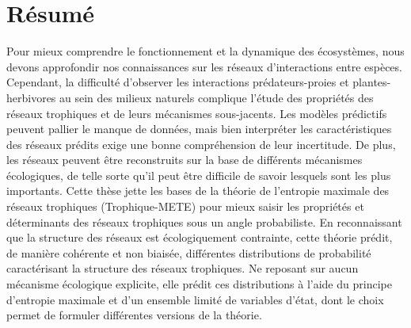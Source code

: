 \documentclass[12pt,twoside,phd]{dms}
\numberwithin{equation}{section}
\numberwithin{table}{chapter}
\numberwithin{figure}{chapter}
\begin{document}
\maketitle
\newpage
\maketitle

\doublespacing


\francais

\setlength{\parskip}{6pt} %

\chapter*{Résumé}

Pour mieux comprendre le fonctionnement et la dynamique des écosystèmes, nous
devons approfondir nos connaissances sur les réseaux d'interactions entre
espèces. Cependant, la difficulté d'observer les interactions prédateurs-proies
et plantes-herbivores au sein des milieux naturels complique l'étude des
propriétés des réseaux trophiques et de leurs mécanismes sous-jacents. Les
modèles prédictifs peuvent pallier le manque de données, mais bien interpréter
les caractéristiques des réseaux prédits exige une bonne compréhension de leur
incertitude. De plus, les réseaux peuvent être reconstruits sur la base de
différents mécanismes écologiques, de telle sorte qu'il peut être difficile de
savoir lesquels sont les plus importants. Cette thèse jette les bases de la
théorie de l'entropie maximale des réseaux trophiques (Trophique-METE) pour
mieux saisir les propriétés et déterminants des réseaux trophiques sous un angle
probabiliste. En reconnaissant que la structure des réseaux est écologiquement
contrainte, cette théorie prédit, de manière cohérente et non biaisée,
différentes distributions de probabilité caractérisant la structure des réseaux
trophiques. Ne reposant sur aucun mécanisme écologique explicite, elle prédit
ces distributions à l'aide du principe d'entropie maximale et d'un ensemble
limité de variables d'état, dont le choix permet de formuler différentes
versions de la théorie. 
\end{document}
